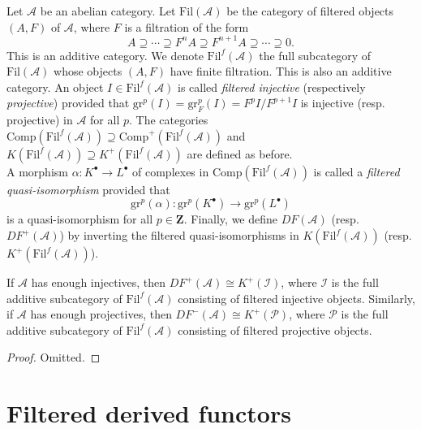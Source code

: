 \begin{definition}
\label{definition-filtered}
Let $\mathcal{A}$ be an abelian category. Let $\text{Fil}(\mathcal{A})$ be the
category of filtered objects $(A, F)$ of $\mathcal{A}$, where $F$ is a
filtration of the form
$$
A \supseteq \cdots \supseteq F^n A \supseteq F^{n+1}A \supseteq \cdots
\supseteq 0.
$$
This is an additive category. We denote $\text{Fil}^f(\mathcal{A})$ the full
subcategory of $\text{Fil}(\mathcal{A})$ whose objects $(A, F)$ have finite
filtration. This is also an additive category. An object $I \in
\text{Fil}^f(\mathcal{A})$ is called {\it filtered injective} (respectively
{\it projective}) provided that $\text{gr}^p(I) = \text{gr}_F^p(I) =
F^pI/F^{p+1}I$ is injective (resp. projective) in $\mathcal{A}$ for all $p$.
The categories $\text{Comp}(\text{Fil}^f(\mathcal{A})) \supseteq
\text{Comp}^+(\text{Fil}^f(\mathcal{A}))$ and $K(\text{Fil}^f(\mathcal{A}))
\supseteq K^+(\text{Fil}^f(\mathcal A))$ are defined as before.
\\
A morphism $\alpha : K^\bullet \to L^\bullet$ of complexes in
$\text{Comp}(\text{Fil}^f(\mathcal{A}))$ is called a {\it filtered
quasi-isomorphism} provided that
$$
\mathrm{gr}^p(\alpha): \mathrm{gr}^p(K^\bullet) \to \mathrm{gr}^p(L^\bullet)
$$
is a quasi-isomorphism for all $p \in \mathbf{Z}$. Finally, we define $D
F(\mathcal{A})$ (resp. $D F^+(\mathcal{A})$) by inverting the filtered
quasi-isomorphisms in $K(\text{Fil}^f(\mathcal{A}))$ (resp.
$K^+(\text{Fil}^f(\mathcal{A}))$).
\end{definition}

\begin{lemma}
\label{lemma-filtered-derived-category}
If $\mathcal{A}$ has enough injectives, then $D F^+(\mathcal{A}) \cong
K^+(\mathcal{I})$, where $\mathcal{I}$ is the full additive subcategory of
$\text{Fil}^f(\mathcal{A})$ consisting of filtered injective objects.
Similarly, if $\mathcal{A}$ has enough projectives, then $D F^-(\mathcal{A})
\cong K^+(\mathcal{P})$, where $\mathcal P$ is the full additive subcategory of
$\text{Fil}^f(\mathcal{A})$ consisting of filtered projective objects.
\end{lemma}

\begin{proof}
Omitted.
\end{proof}





\section{Filtered derived functors}
\label{section-filtered-derived-functors}

